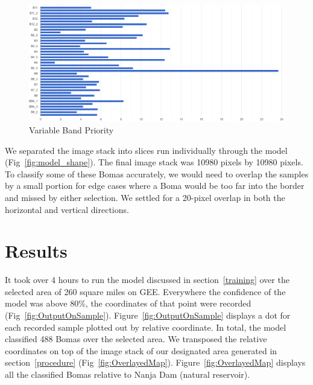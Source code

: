 \documentclass[10pt]{article}
\begin{document}
\begin{figure} [H]
    \centering
    \includegraphics[width=1\linewidth]{images/bands importance.png}
    \caption{Variable Band Priority}
    \label{fig:band_importance}
\end{figure}

We separated the image stack into slices run individually through the model (Fig~\ref{fig:model_shape}). The final image stack was 10980 pixels by 10980 pixels. To classify some of these Bomas accurately, we would need to overlap the samples by a small portion for edge cases where a Boma would be too far into the border and missed by either selection. We settled for a 20-pixel overlap in both the horizontal and vertical directions.


\section{Results}

It took over 4 hours to run the model discussed in section~\ref{training} over the selected area of 260 square miles on GEE. Everywhere the confidence of the model was above 80\%, the coordinates of that point were recorded (Fig~\ref{fig:OutputOnSample}). Figure~\ref{fig:OutputOnSample} displays a dot for each recorded sample plotted out by relative coordinate. In total, the model classified 488 Bomas over the selected area. We transposed the relative coordinates on top of the image stack of our designated area generated in section~\ref{procedure} (Fig~\ref{fig:OverlayedMap}). Figure~\ref{fig:OverlayedMap} displays all the classified Bomas relative to Nanja Dam (natural reservoir).
\end{document}
